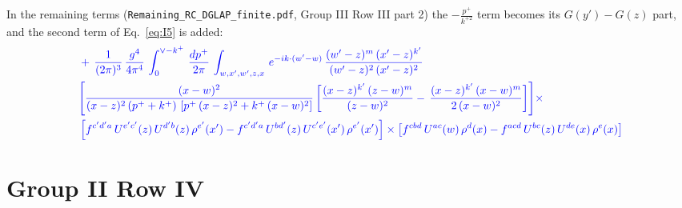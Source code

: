 \documentclass[10pt]{article}
\numberwithin{equation}{section}
\newcommand{\nc}{\color{blue}}
\begin{document}
In the remaining terms (\texttt{Remaining\_RC\_DGLAP\_finite.pdf}, Group III Row III part 2) the $-\frac{p^+}{k^{+2}}$ term becomes its $G(y')-G(z)$ part, and the second term of Eq.~\eqref{eq:I5} is added:
\begin{align}
&\nc +\,\frac{1}{(2\pi)^{3}}\,\frac{g^{4}}{4\pi^{4}}\,\int_{0}^{\vee-k^{+}}\, \frac{dp^{+}}{2\pi}\,\int_{w,x',w',z,x}\, e^{-ik\cdot (w'-w)}\, \frac{(w'-z)^{m}\,(x'-z)^{k'}}{(w'-z)^{2}\,(x'-z)^{2}}\, \notag \\ & \nc  \Bigg[ \frac{(x-w)^{2}}{(x-z)^{2}\,(p^{+}+k^{+})\,\left[p^{+}\,(x-z)^{2}+k^{+}\,(x-w)^{2}\right]}\,\bigg[\frac{(x-z)^{k'}\,(z-w)^{m}}{(z-w)^{2}} -\,\frac{(x-z)^{k'}\,(x-w)^{m}}{2\,(x-w)^{2}}\bigg] \Bigg]\times\,\notag \\ & \nc  \left[f^{c'd'a}\,U^{e'c'}(z)\,U^{d'b}(z)\,\rho^{e'}(x')-f^{c'd'a}\, 
    U^{bd'}(z)\,U^{c'e'}(x')\,\rho^{e'}(x')\right]\times \left[f^{cbd}\,U^{ac}(w)\,\rho^{d}(x) -f^{acd}\,U^{bc}(z)\,U^{de}(x)\,\rho^{e}(x)\right]
\end{align}


\section{Group II Row IV}\label{sec:G2IV}
\end{document}
